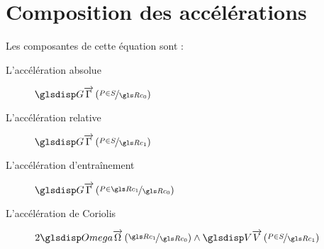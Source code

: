 \section{Composition des accélérations}
\begin{theorem}
\end{theorem}
Les composantes de cette équation sont :
\begin{description}
	\item[L'accélération absolue] $\G[\Rc_0]{P}{S}$
	\item[L'accélération relative] $\G[\Rc_1]{P}{S}$
	\item[L'accélération d'entraînement] $\G[\Rc_0]{P}{\Rc_1}$
	\item[L'accélération de Coriolis] $2\Om[\Rc_0]{\Rc_1}\wedge\V[\Rc_1]{P}{S}$
\end{description}

